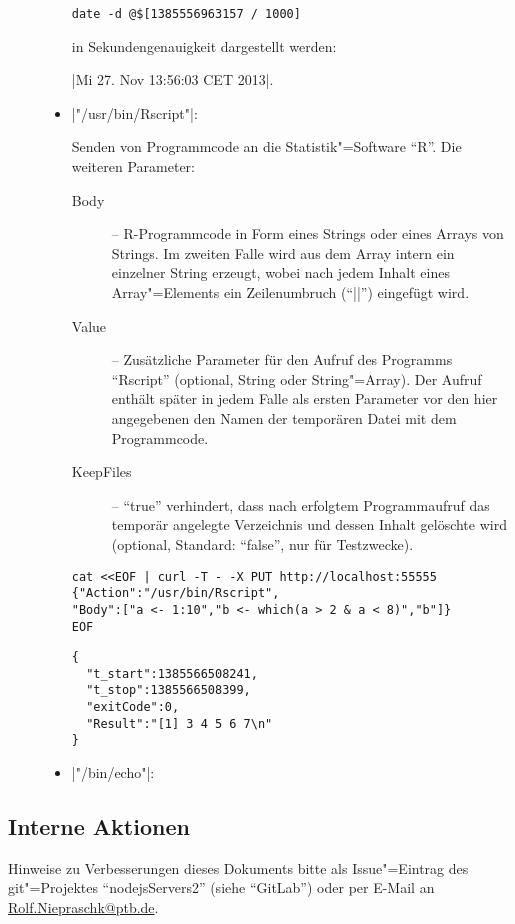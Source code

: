 \documentclass[%
fontsize=11pt
,paper=a4
,twoside
,headings=normal
,pagesize
]{scrartcl}
\begin{document}
\begin{description}
\begin{itemize}
\begin{lstlisting}[language={}]
date -d @$[1385556963157 / 1000]
\end{lstlisting}

      in Sekundengenauigkeit dargestellt werden: \par
      \quad |Mi 27. Nov 13:56:03 CET 2013|.

    \item |"/usr/bin/Rscript"|: \par

      Senden von Programmcode an die Statistik"=Software "`R"'. Die weiteren
      Parameter:
      \begin{description}

        \item[Body] -- R-Programmcode in Form eines Strings oder eines
        Arrays von Strings. Im zweiten Falle wird aus dem Array intern ein
        einzelner String erzeugt, wobei nach jedem Inhalt eines
        Array"=Elements ein Zeilenumbruch ("`|\n|"') eingefügt wird.

        \item[Value] -- Zusätzliche Parameter für den Aufruf des Programms
        "`Rscript"' (optional, String oder String"=Array). Der Aufruf
        enthält später in jedem Falle als ersten Parameter vor den hier
        angegebenen den Namen der temporären Datei mit dem Programmcode.

        \item[KeepFiles] -- "`true"' verhindert, dass nach erfolgtem
        Programmaufruf das temporär angelegte Verzeichnis und dessen Inhalt
        gelöschte wird (optional, Standard: "`false"', nur für Testzwecke).

      \end{description}
\enlargethispage{-2\baselineskip}
\begin{lstlisting}[language={},name=Beispiel:]
cat <<EOF | curl -T - -X PUT http://localhost:55555
{"Action":"/usr/bin/Rscript",
"Body":["a <- 1:10","b <- which(a > 2 & a < 8)","b"]}
EOF
\end{lstlisting}

\begin{lstlisting}[language={},name=Rückgabe:]
{
  "t_start":1385566508241,
  "t_stop":1385566508399,
  "exitCode":0,
  "Result":"[1] 3 4 5 6 7\n"
}
\end{lstlisting}

    \item |"/bin/echo"|: \par

  \end{itemize}

\end{description}

\subsection*{Interne Aktionen}



\vfill

\begingroup \small \itshape

\noindent Hinweise zu Verbesserungen dieses Dokuments bitte als
Issue"=Eintrag des git"=Projektes "`nodejsServers2"' (siehe "`GitLab"') oder per
E-Mail an \url{Rolf.Niepraschk@ptb.de}.

\endgroup
\end{document}
